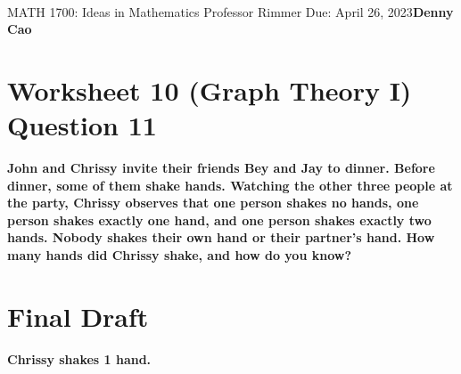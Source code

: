 \documentclass[article, 12pt]{article}
\title{\Large\bf{\psetName}}
\makeatletter
\theoremstyle{definition}
\newcommand{\courseNumber}{MATH 1700}
\newcommand{\courseName}{Ideas in Mathematics}
\newcommand{\professor}{Professor Rimmer}
\newcommand{\dueDate}{Due: April 26, 2023}
\newcommand{\name}{Denny Cao}
\renewcommand{\maketitle}{\bgroup\setlength{\parindent}{0pt}
    \begin{flushleft}
        \textbf{\@title} \\ \vskip0.2cm
        \begingroup
            \fontsize{14pt}{12pt}\selectfont
            \courseNumber: \courseName 
            \vskip0.3cm 
            \professor
        \endgroup \vskip0.3cm
        \dueDate \hfill\rlap{}\bf{\name} \\ \vskip0.1cm
        \hrulefill
    \end{flushleft}\egroup 
}
\makeatother
\begin{document}
    \maketitle
    \thispagestyle{plain}
    \section*{Worksheet 10 (Graph Theory I) Question 11}
    \textbf{John and Chrissy invite their friends Bey and Jay to dinner. Before dinner, some of them shake hands. Watching the other three people at the party, Chrissy observes that one person shakes no hands, one person shakes exactly one hand, and one person shakes exactly two hands. Nobody shakes their own hand or their partner's hand. How many hands did Chrissy shake, and how do you know?}
    \section*{Final Draft}
    \textbf{Chrissy shakes 1 hand.} 
\end{document}

